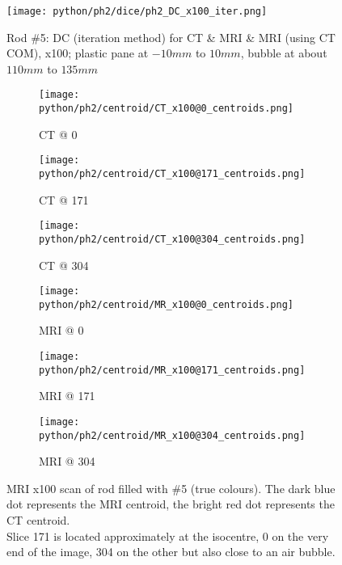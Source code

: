 \begin{figure}[!bth]
    \centering
    \texttt{[image: python/ph2/dice/ph2\_DC\_x100\_iter.png]}
    \caption{Rod \#5: DC (iteration method) for CT \& MRI \& MRI (using CT COM), x100; plastic pane at $-10mm$ to $10mm$, bubble at about $110mm$ to $135mm$}
    \label{fig:ph2_DC_x100}
\end{figure}


\begin{figure}[!tbp]
  \begin{subfigure}[b]{0.32\textwidth}
    \texttt{[image: python/ph2/centroid/CT\_x100@0\_centroids.png]}
    \caption{CT @ 0}
    \label{fig:CT_x100_centroids@0}
  \end{subfigure}
  \begin{subfigure}[b]{0.32\textwidth}
    \texttt{[image: python/ph2/centroid/CT\_x100@171\_centroids.png]}
    \caption{CT @ 171}
    \label{fig:CT_x100_centroids@171}
  \end{subfigure}
  \begin{subfigure}[b]{0.32\textwidth}
    \texttt{[image: python/ph2/centroid/CT\_x100@304\_centroids.png]}
    \caption{CT @ 304}
    \label{fig:CT_x100_centroids@304}
  \end{subfigure}
  \begin{subfigure}[b]{0.32\textwidth}
    \texttt{[image: python/ph2/centroid/MR\_x100@0\_centroids.png]}
    \caption{MRI @ 0}
    \label{fig:MR_x100_centroids@0}
  \end{subfigure}
  \begin{subfigure}[b]{0.32\textwidth}
    \texttt{[image: python/ph2/centroid/MR\_x100@171\_centroids.png]}
    \caption{MRI @ 171}
    \label{fig:MR_x100_centroids@171}
  \end{subfigure}
  \begin{subfigure}[b]{0.32\textwidth}
    \texttt{[image: python/ph2/centroid/MR\_x100@304\_centroids.png]}
    \caption{MRI @ 304}
    \label{fig:MR_x100_centroids@304}
  \end{subfigure}
  \caption{MRI x100 scan of rod filled with \#5 (true colours). The dark blue dot represents the MRI centroid, the bright red dot represents the CT centroid.
  			\\ Slice 171 is located approximately at the isocentre, 0 on the very end of the image, 304 on the other but also close to an air bubble.}
  \label{fig:MR_x100_centroids}
\end{figure}

